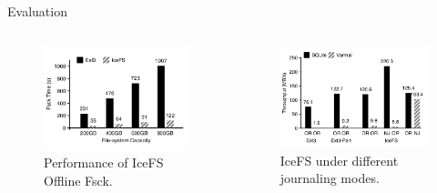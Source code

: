 \documentclass[aspectratio=169]{beamer}
\begin{document}
\begin{frame}{Evaluation}
    \begin{columns}[T]
        \begin{column}{0.4\textwidth}
            \begin{figure}
                \includegraphics[scale=0.3]{./figures/fig8.png}
                \caption{Performance of IceFS Offline Fsck.}
            \end{figure}
        \end{column}
        \begin{column}{0.4\textwidth}
            \begin{figure}
                \includegraphics[scale=0.3]{./figures/fig9.png}
                \caption{IceFS under different journaling modes.}
            \end{figure}
        \end{column}
    \end{columns}
\end{frame}
\end{document}
